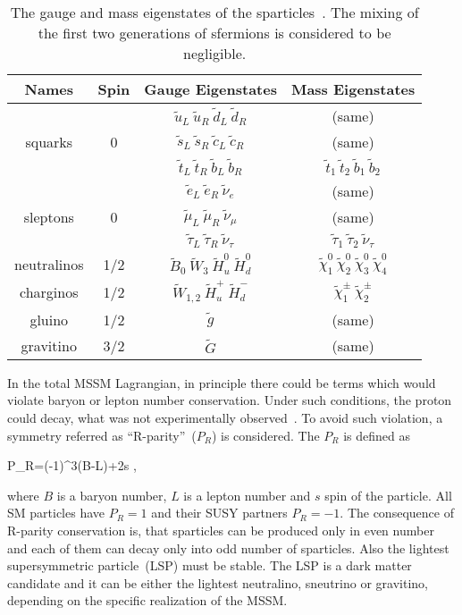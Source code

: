 \begin{table}[h]
\begin{center}
\begin{tabular}{|c|c|c|c|}
\hline
Names & Spin  & Gauge Eigenstates & Mass Eigenstates  \\
\hline
        &   & $\tilde{u}_{L}~\tilde{u}_{R}~\tilde{d}_{L}~\tilde{d}_{R}$  & (same) \\
squarks & 0 & $\tilde{s}_{L}~\tilde{s}_{R}~\tilde{c}_{L}~\tilde{c}_{R}$  & (same) \\
        &   & $\tilde{t}_{L}~\tilde{t}_{R}~\tilde{b}_{L}~\tilde{b}_{R}$  & $\tilde{t}_{1}~\tilde{t}_{2}~\tilde{b}_{1}~\tilde{b}_{2}$ \\
\hline
         &   & $\tilde{e}_{L}~\tilde{e}_{R}~\tilde{\nu}_{e}$  & (same) \\
sleptons & 0 & $\tilde{\mu}_{L}~\tilde{\mu}_{R}~\tilde{\nu}_{\mu}$  & (same) \\
         &   & $\tilde{\tau}_{L}~\tilde{\tau}_{R}~\tilde{\nu}_{\tau}$  & $\tilde{\tau}_{1}~\tilde{\tau}_{2}~\tilde{\nu}_{\tau}$ \\
\hline
neutralinos & 1/2 & $\tilde{B}_{0}~\tilde{W}_{3}~\tilde{H}_{u}^{0}~\tilde{H}_{d}^{0}$  & $\tilde{\chi}_{1}^{0}~\tilde{\chi}_{2}^{0}~\tilde{\chi}_{3}^{0}~\tilde{\chi}_{4}^{0} $ \\
\hline
charginos & 1/2 & $\tilde{W}_{1,2}~\tilde{H}_{u}^{+}~\tilde{H}_{d}^{-}$  & $\tilde{\chi}_{1}^{\pm}~\tilde{\chi}_{2}^{\pm} $ \\
\hline
gluino & 1/2 & $\tilde{g}$  & (same) \\
\hline
gravitino & 3/2 & $\tilde{G}$  & (same) \\
\hline
\end{tabular}
\caption[Table caption text]{The gauge and mass eigenstates of the sparticles~\cite{Martin:1997ns}. The mixing of the first two generations of sfermions is considered to be negligible. }
\label{tab:SUSYspectrum}
\end{center}
\end{table}

In the total MSSM Lagrangian, in principle there could be terms which would violate baryon or lepton number conservation. Under such conditions, the proton could decay, what was not experimentally observed~\cite{Nishino:2009aa}. To avoid such violation, a symmetry referred as ``R-parity''~($P_{R}$) is considered. The $P_{R}$ is defined as

{
P_R=(-1)^{3(B-L)+2s },
}

where $B$ is a baryon number, $L$ is a lepton number and $s$ spin of the particle. All SM particles have $P_{R}=1$ and their SUSY partners $P_{R}=-1$. The consequence of R-parity conservation is, that sparticles can be produced only in even number and each of them can decay only into odd number of sparticles. Also the lightest supersymmetric particle~(LSP) must be stable. The LSP is a dark matter candidate and it can be either the lightest neutralino, sneutrino or gravitino, depending on the specific realization of the MSSM. 


